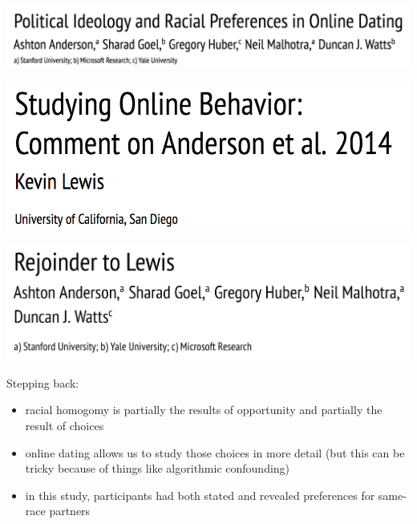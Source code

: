 \documentclass[aspectratio=169]{beamer}
\begin{document}
\begin{frame}

\begin{center}
\includegraphics[height=0.2\textheight]{figures/anderson_political_2014_title}
\end{center}

\begin{center}
\includegraphics[height=0.3\textheight]{figures/lewis_studying_2015_title}
\end{center}

\begin{center}
\includegraphics[height=0.3\textheight]{figures/anderson_rejoinder_2015_title}
\end{center}


 
\end{frame}
\begin{frame}

Stepping back:
\begin{itemize}
\item racial homogomy is partially the results of opportunity and partially the result of choices \pause
\item online dating allows us to study those choices in more detail (but this can be tricky because of things like algorithmic confounding) \pause
\item in this study, participants had both stated and revealed preferences for same-race partners
\end{itemize}

\end{frame}
\end{document}
